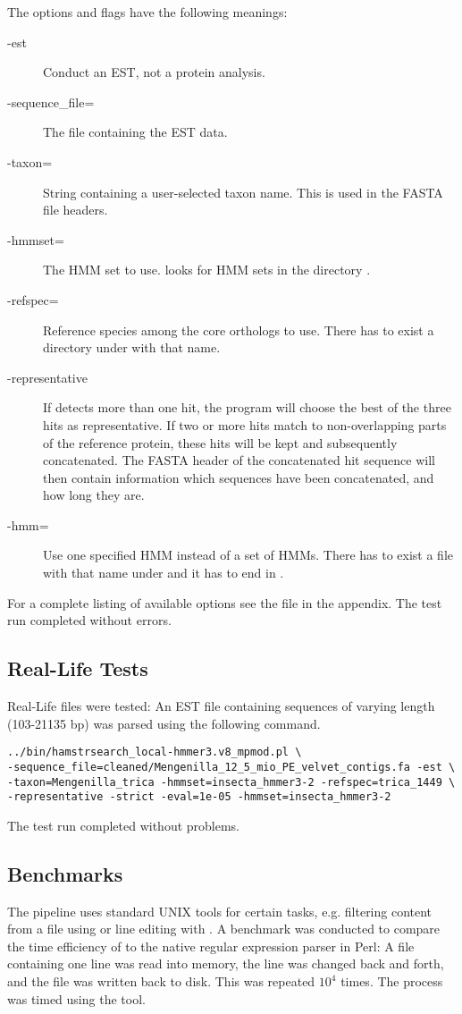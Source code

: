 The options and flags have the following meanings:
\begin{description}
	\item[-est] Conduct an EST, not a protein analysis.
	\item[-sequence\_file=] The file containing the EST data.
	\item[-taxon=] String containing a user-selected taxon name. This is used in the FASTA file headers.
	\item[-hmmset=] The HMM set to use. \hamstr looks for HMM sets in the directory .
	\item[-refspec=] Reference species among the core orthologs to use. There has to exist a directory under  with that name.
	\item[-representative] If \hamstr detects more than one hit, the program will choose the best of the three hits as representative. If two or more hits match to non-overlapping parts of the reference protein, these hits will be kept and subsequently concatenated. The FASTA header of the concatenated hit sequence will then contain information which sequences have been concatenated, and how long they are.
	\item[-hmm=] Use one specified HMM instead of a set of HMMs. There has to exist a file with that name under  and it has to end in .
\end{description}
For a complete listing of available options see the \hamstr {} file in the appendix. The test run completed without errors.

\subsection{Real-Life Tests}
Real-Life files were tested: An EST file containing sequences of varying length (103-21135 bp) was parsed using the following command.

\begin{verbatim}
../bin/hamstrsearch_local-hmmer3.v8_mpmod.pl \
-sequence_file=cleaned/Mengenilla_12_5_mio_PE_velvet_contigs.fa -est \
-taxon=Mengenilla_trica -hmmset=insecta_hmmer3-2 -refspec=trica_1449 \
-representative -strict -eval=1e-05 -hmmset=insecta_hmmer3-2 
\end{verbatim}

The test run completed without problems.

\subsection{Benchmarks}
The \hamstr pipeline uses standard UNIX tools for certain tasks, e.g. filtering
content from a file using  or line editing with . A
benchmark was conducted to compare the time efficiency of  to the
native regular expression parser in Perl: A file containing one line was read
into memory, the line was changed back and forth, and the file was written back
to disk. This was repeated $10^4$ times. The process was timed using the
\code{time} tool.

